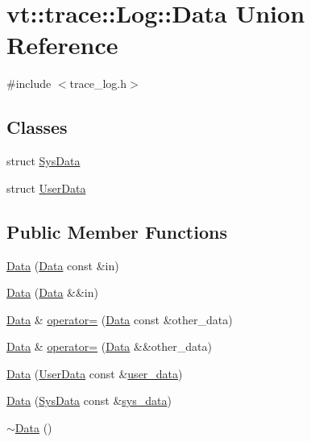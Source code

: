 \hypertarget{unionvt_1_1trace_1_1_log_1_1_data}{}\section{vt\+:\+:trace\+:\+:Log\+:\+:Data Union Reference}
\label{unionvt_1_1trace_1_1_log_1_1_data}


{\ttfamily \#include $<$trace\+\_\+log.\+h$>$}

\subsection*{Classes}
\begin{DoxyCompactItemize}
\item 
struct \hyperlink{structvt_1_1trace_1_1_log_1_1_data_1_1_sys_data}{Sys\+Data}
\item 
struct \hyperlink{structvt_1_1trace_1_1_log_1_1_data_1_1_user_data}{User\+Data}
\end{DoxyCompactItemize}
\subsection*{Public Member Functions}
\begin{DoxyCompactItemize}
\item 
\hyperlink{unionvt_1_1trace_1_1_log_1_1_data_aa391f018a8b00d5d9d5083ff3f846fcd}{Data} (\hyperlink{unionvt_1_1trace_1_1_log_1_1_data}{Data} const \&in)
\item 
\hyperlink{unionvt_1_1trace_1_1_log_1_1_data_afd6d8af98a0fc51666b55dabe8460d0c}{Data} (\hyperlink{unionvt_1_1trace_1_1_log_1_1_data}{Data} \&\&in)
\item 
\hyperlink{unionvt_1_1trace_1_1_log_1_1_data}{Data} \& \hyperlink{unionvt_1_1trace_1_1_log_1_1_data_a9a3cab1f1e1983d77f9a7766aa464cf6}{operator=} (\hyperlink{unionvt_1_1trace_1_1_log_1_1_data}{Data} const \&other\+\_\+data)
\item 
\hyperlink{unionvt_1_1trace_1_1_log_1_1_data}{Data} \& \hyperlink{unionvt_1_1trace_1_1_log_1_1_data_a6f90113c26e6b4c60ce2159dab367356}{operator=} (\hyperlink{unionvt_1_1trace_1_1_log_1_1_data}{Data} \&\&other\+\_\+data)
\item 
\hyperlink{unionvt_1_1trace_1_1_log_1_1_data_aa76f0f5895f20a4b607e2666b2ad944e}{Data} (\hyperlink{structvt_1_1trace_1_1_log_1_1_data_1_1_user_data}{User\+Data} const \&\hyperlink{structvt_1_1trace_1_1_log_a7b251bc7dcebcbbafa29cc2ca6ea4c12}{user\+\_\+data})
\item 
\hyperlink{unionvt_1_1trace_1_1_log_1_1_data_ae94b837f6aa6d25ad87df4b05f089ed9}{Data} (\hyperlink{structvt_1_1trace_1_1_log_1_1_data_1_1_sys_data}{Sys\+Data} const \&\hyperlink{structvt_1_1trace_1_1_log_a082937c397ac5b47ffc9089ff94698f0}{sys\+\_\+data})
\item 
\hyperlink{unionvt_1_1trace_1_1_log_1_1_data_a756ed898d9a1df126b2e214050f158e1}{$\sim$\+Data} ()
\end{DoxyCompactItemize}
